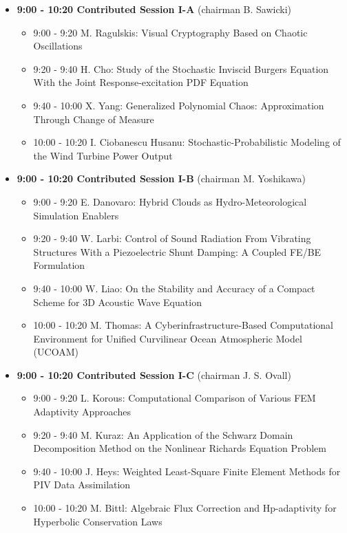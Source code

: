 \documentclass[10pt, A4]{article}%
\begin{document}
\begin{itemize}    
  \item {\bf 9:00 - 10:20 Contributed Session I-A} (chairman B. Sawicki) 
  \begin{itemize}
    \item 9:00 - 9:20 {M. Ragulskis}: {Visual Cryptography Based on Chaotic Oscillations}  %
    \item 9:20 - 9:40 {H. Cho}: {Study of the Stochastic Inviscid Burgers Equation With the Joint Response-excitation PDF Equation}
    \item 9:40 - 10:00 {X. Yang}: {Generalized Polynomial Chaos: Approximation Through Change of Measure}
    \item 10:00 - 10:20 {I. Ciobanescu Husanu}: {Stochastic-Probabilistic Modeling of the Wind Turbine Power Output}
  \end{itemize}
  \item {\bf 9:00 - 10:20 Contributed Session I-B} (chairman M. Yoshikawa) 
  \begin{itemize}
    \item 9:00 - 9:20 {E. Danovaro}: {Hybrid Clouds as Hydro-Meteorological Simulation Enablers}
    \item 9:20 - 9:40 {W. Larbi}: {Control of Sound Radiation From Vibrating Structures With a Piezoelectric Shunt Damping: A Coupled FE/BE Formulation}
    \item 9:40 - 10:00 {W. Liao}: {On the Stability and Accuracy of a Compact Scheme for 3D Acoustic Wave Equation}
    \item 10:00 - 10:20 {M. Thomas}: {A Cyberinfrastructure-Based Computational Environment for Unified Curvilinear Ocean Atmospheric Model  (UCOAM)}
  \end{itemize}
    \item {\bf 9:00 - 10:20 Contributed Session I-C} (chairman J. S. Ovall) 
  \begin{itemize}
    \item 9:00 - 9:20 {L. Korous}: {Computational Comparison of Various FEM Adaptivity Approaches}
    \item 9:20 - 9:40 {M. Kuraz}: {An Application of the Schwarz Domain Decomposition Method on the Nonlinear Richards Equation Problem}
    \item 9:40 - 10:00 {J. Heys}: {Weighted Least-Square Finite Element Methods for PIV Data Assimilation}
    \item 10:00 - 10:20 {M. Bittl}: {Algebraic Flux Correction and Hp-adaptivity for Hyperbolic Conservation Laws}

\end{itemize}
\end{itemize}
\end{document}
